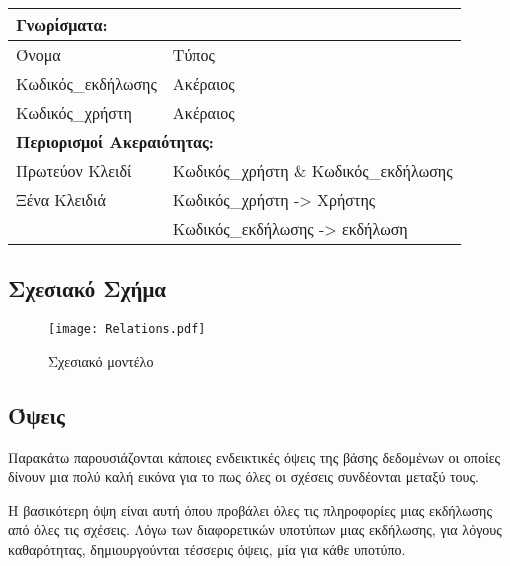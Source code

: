 \begin{tabular}{|p{6cm}|p{8cm}|}
  \multicolumn{2}{l}{\textbf{Γνωρίσματα:}}                   \\ \hline
  Όνομα              & Τύπος                                 \\ \hline
  Κωδικός\_εκδήλωσης & Ακέραιος                              \\ \hline
  Κωδικός\_χρήστη    & Ακέραιος                              \\ \hline
  \multicolumn{2}{l}{\textbf{Περιορισμοί Ακεραιότητας:}}     \\ \hline
  Πρωτεύον Κλειδί    & Κωδικός\_χρήστη \& Κωδικός\_εκδήλωσης \\ \hline
  Ξένα Κλειδιά       & Κωδικός\_χρήστη -> Χρήστης            \\ \hline
                     & Κωδικός\_εκδήλωσης -> εκδήλωση        \\ \hline
\end{tabular}

\subsection{Σχεσιακό Σχήμα}

\begin{figure}[H]
  \centering
  \texttt{[image: Relations.pdf]}
  \caption{Σχεσιακό μοντέλο}
\end{figure}

\subsection{Όψεις}

Παρακάτω παρουσιάζονται κάποιες ενδεικτικές όψεις της βάσης δεδομένων
οι οποίες δίνουν μια πολύ καλή εικόνα για το πως όλες οι σχέσεις
συνδέονται μεταξύ τους.

Η βασικότερη όψη είναι αυτή όπου προβάλει όλες τις πληροφορίες μιας
εκδήλωσης από όλες τις σχέσεις. Λόγω των διαφορετικών υποτύπων μιας
εκδήλωσης, για λόγους καθαρότητας, δημιουργούνται τέσσερις όψεις, μία
για κάθε υποτύπο.

